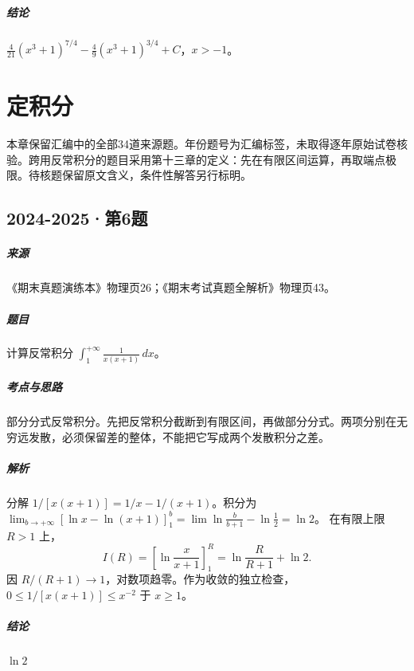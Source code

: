 \documentclass[UTF8,fontset=fandol,12pt,oneside,openany]{ctexrep}
\theoremstyle{definition}
\begin{document}
\paragraph{结论}$\boxed{\frac4{21}(x^3+1)^{7/4}-\frac49(x^3+1)^{3/4}+C}$，$x>-1$。


\chapter{定积分}
\label{exam:11:chapter}
本章保留汇编中的全部34道来源题。年份题号为汇编标签，未取得逐年原始试卷核验。跨用反常积分的题目采用第十三章的定义：先在有限区间运算，再取端点极限。待核题保留原文含义，条件性解答另行标明。

\par\addvspace{18pt}\noindent\begin{minipage}{\linewidth}
\section{2024-2025·第6题}
\label{exam:11:q1}
\paragraph{来源} 《期末真题演练本》物理页26；《期末考试真题全解析》物理页43。
\paragraph{题目}
计算反常积分 $\int_1^{+\infty}\frac1{x(x+1)}\,dx$。
\end{minipage}\par
\paragraph{考点与思路}
部分分式反常积分。先把反常积分截断到有限区间，再做部分分式。两项分别在无穷远发散，必须保留差的整体，不能把它写成两个发散积分之差。
\paragraph{解析}
分解 $1/[x(x+1)]=1/x-1/(x+1)$。积分为 $\lim_{b\to+\infty}[\ln x-\ln(x+1)]_1^b=\lim\ln\frac b{b+1}-\ln\frac12=\ln2$。
在有限上限 $R>1$ 上，\[
I(R)=\left[\ln\frac{x}{x+1}\right]_1^R
=\ln\frac R{R+1}+\ln2.
\]
因 $R/(R+1)\to1$，对数项趋零。作为收敛的独立检查，$0\le1/[x(x+1)]\le x^{-2}$ 于 $x\ge1$。
\paragraph{结论}
$\ln2$
\end{document}
